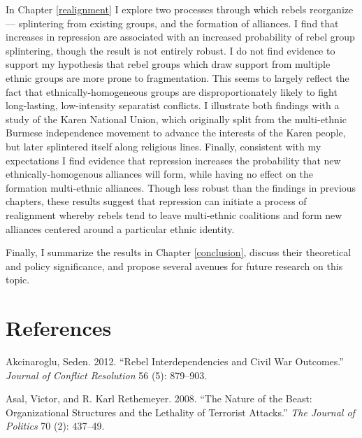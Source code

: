 \documentclass[12pt,]{book}
\theoremstyle{definition}
\theoremstyle{definition}
\theoremstyle{remark}
\begin{document}
In Chapter \ref{realignment} I explore two processes through which
rebels reorganize --- splintering from existing groups, and the
formation of alliances. I find that increases in repression are
associated with an increased probability of rebel group splintering,
though the result is not entirely robust. I do not find evidence to
support my hypothesis that rebel groups which draw support from multiple
ethnic groups are more prone to fragmentation. This seems to largely
reflect the fact that ethnically-homogeneous groups are
disproportionately likely to fight long-lasting, low-intensity
separatist conflicts. I illustrate both findings with a study of the
Karen National Union, which originally split from the multi-ethnic
Burmese independence movement to advance the interests of the Karen
people, but later splintered itself along religious lines. Finally,
consistent with my expectations I find evidence that repression
increases the probability that new ethnically-homogenous alliances will
form, while having no effect on the formation multi-ethnic alliances.
Though less robust than the findings in previous chapters, these results
suggest that repression can initiate a process of realignment whereby
rebels tend to leave multi-ethnic coalitions and form new alliances
centered around a particular ethnic identity.

Finally, I summarize the results in Chapter \ref{conclusion}, discuss
their theoretical and policy significance, and propose several avenues
for future research on this topic.

\chapter*{References}\label{references}


\indent

\setlength{\parindent}{-0.2in} \setlength{\leftskip}{0.2in}
\setlength{\parskip}{8pt}

\singlespacing

\hypertarget{refs}{}
\hypertarget{ref-Akcinaroglu2012}{}
Akcinaroglu, Seden. 2012. ``Rebel Interdependencies and Civil War
Outcomes.'' \emph{Journal of Conflict Resolution} 56 (5): 879--903.

\hypertarget{ref-Asal2008}{}
Asal, Victor, and R. Karl Rethemeyer. 2008. ``The Nature of the Beast:
Organizational Structures and the Lethality of Terrorist Attacks.''
\emph{The Journal of Politics} 70 (2): 437--49.
\end{document}
